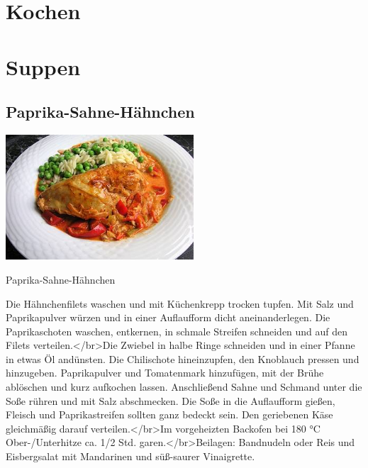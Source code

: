 \documentclass[12pt]{book}
\begin{document}
		\newpage
  \chapter{Kochen}
\begin{mytextbox}
\end{mytextbox}
\newpage
  \chapter{Suppen}
\begin{mytextbox}
\end{mytextbox}
\newpage
	\begin{multicols}{2}
\begin{mytextbox}
  \section{Paprika-Sahne-Hähnchen}



  \begin{center}
    \includegraphics[width=7cm]{8d3eb2e33142426fff48e29184626861}
  \end{center}


  \begin{center}
    Paprika-Sahne-Hähnchen
  \end{center}

  Die Hähnchenfilets waschen und mit Küchenkrepp trocken tupfen. Mit Salz und Paprikapulver würzen und in einer Auflaufform dicht aneinanderlegen. Die Paprikaschoten waschen, entkernen, in schmale Streifen schneiden und auf den Filets verteilen.</br>Die Zwiebel in halbe Ringe schneiden und in einer Pfanne in etwas Öl andünsten. Die Chilischote hineinzupfen, den Knoblauch pressen und hinzugeben. Paprikapulver und Tomatenmark hinzufügen, mit der Brühe ablöschen und kurz aufkochen lassen. Anschließend Sahne und Schmand unter die Soße rühren und mit Salz abschmecken. Die Soße in die Auflaufform gießen, Fleisch und Paprikastreifen sollten ganz bedeckt sein. Den geriebenen Käse gleichmäßig darauf verteilen.</br>Im vorgeheizten Backofen bei 180 °C Ober-/Unterhitze ca. 1/2 Std. garen.</br>Beilagen: Bandnudeln oder Reis und Eisbergsalat mit Mandarinen und süß-saurer Vinaigrette.


\end{mytextbox}
\end{multicols}
\end{document}
